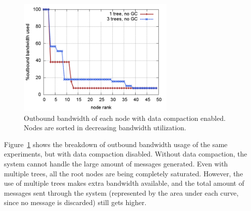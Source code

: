 \begin{figure}[t]
\begin{center}
\includegraphics[width=3in]{img/bw-nogc.png}
\end{center}
\caption{\label{fig:bw-nogc} Outbound bandwidth of each node with data
compaction enabled.  Nodes are sorted in decreasing bandwidth utilization.}
\end{figure}

Figure~\ref{fig:bw-nogc} shows the breakdown of outbound bandwidth usage of the
same experiments, but with data compaction disabled.  Without data compaction,
the system cannot handle the large amount of messages generated.  Even with
multiple trees, all the root nodes are being completely saturated.  However,
the use of multiple trees makes extra bandwidth available, and the total amount
of messages sent through the system (represented by the area under each curve,
since no message is discarded) still gets higher.

